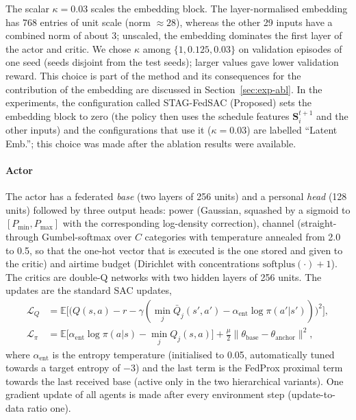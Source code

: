 The scalar $\kappa=0.03$ scales the embedding block. The layer-normalised embedding has 768 entries of unit scale (norm $\approx 28$), whereas the other 29 inputs have a combined norm of about 3; unscaled, the embedding dominates the first layer of the actor and critic. We chose $\kappa$ among $\{1,0.125,0.03\}$ on validation episodes of one seed (seeds disjoint from the test seeds); larger values gave lower validation reward. This choice is part of the method and its consequences for the contribution of the embedding are discussed in Section~\ref{sec:exp-abl}. In the experiments, the configuration called STAG-FedSAC (Proposed) sets the embedding block to zero (the policy then uses the schedule features $\mathbf{S}_i^{t+1}$ and the other inputs) and the configurations that use it ($\kappa=0.03$) are labelled ``Latent Emb.''; this choice was made after the ablation results were available.

\paragraph{Actor} The actor has a federated \emph{base} (two layers of 256 units) and a personal \emph{head} (128 units) followed by three output heads: power (Gaussian, squashed by a sigmoid to $[P_{\min},P_{\max}]$ with the corresponding log-density correction), channel (straight-through Gumbel-softmax over $C$ categories with temperature annealed from 2.0 to 0.5, so that the one-hot vector that is executed is the one stored and given to the critic) and airtime budget (Dirichlet with concentrations $\mathrm{softplus}(\cdot)+1$). The critics are double-Q networks with two hidden layers of 256 units. The updates are the standard SAC updates,
\begin{align}
  \mathcal{L}_Q&=\mathbb{E}\Big[\big(Q(s,a)-r-\gamma(\min_j\bar Q_j(s',a')-\alpha_{\mathrm{ent}}\log\pi(a'|s'))\big)^2\Big], \label{eq:critic}\\
  \mathcal{L}_\pi&=\mathbb{E}\big[\alpha_{\mathrm{ent}}\log\pi(a|s)-\min_jQ_j(s,a)\big]+\tfrac{\mu}{2}\|\theta_{\mathrm{base}}-\theta_{\mathrm{anchor}}\|^2, \label{eq:actor}
\end{align}
where $\alpha_{\mathrm{ent}}$ is the entropy temperature (initialised to 0.05, automatically tuned towards a target entropy of $-3$) and the last term is the FedProx proximal term towards the last received base (active only in the two hierarchical variants). One gradient update of all agents is made after every environment step (update-to-data ratio one).

